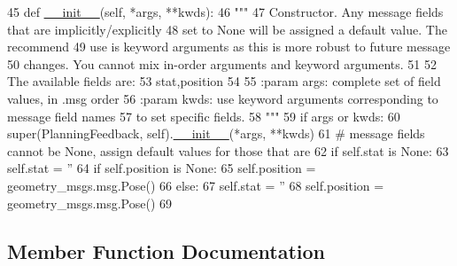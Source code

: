 \begin{DoxyCode}
45   \textcolor{keyword}{def }\hyperlink{classstate__machine_1_1Play_a5993a23d8be7f7b2647f71ede0334957}{\_\_init\_\_}(self, *args, **kwds):
46     \textcolor{stringliteral}{"""}
47 \textcolor{stringliteral}{    Constructor. Any message fields that are implicitly/explicitly}
48 \textcolor{stringliteral}{    set to None will be assigned a default value. The recommend}
49 \textcolor{stringliteral}{    use is keyword arguments as this is more robust to future message}
50 \textcolor{stringliteral}{    changes.  You cannot mix in-order arguments and keyword arguments.}
51 \textcolor{stringliteral}{}
52 \textcolor{stringliteral}{    The available fields are:}
53 \textcolor{stringliteral}{       stat,position}
54 \textcolor{stringliteral}{}
55 \textcolor{stringliteral}{    :param args: complete set of field values, in .msg order}
56 \textcolor{stringliteral}{    :param kwds: use keyword arguments corresponding to message field names}
57 \textcolor{stringliteral}{    to set specific fields.}
58 \textcolor{stringliteral}{    """}
59     \textcolor{keywordflow}{if} args \textcolor{keywordflow}{or} kwds:
60       super(PlanningFeedback, self).\hyperlink{classstate__machine_1_1Play_a5993a23d8be7f7b2647f71ede0334957}{\_\_init\_\_}(*args, **kwds)
61       \textcolor{comment}{# message fields cannot be None, assign default values for those that are}
62       \textcolor{keywordflow}{if} self.stat \textcolor{keywordflow}{is} \textcolor{keywordtype}{None}:
63         self.stat = \textcolor{stringliteral}{''}
64       \textcolor{keywordflow}{if} self.position \textcolor{keywordflow}{is} \textcolor{keywordtype}{None}:
65         self.position = geometry\_msgs.msg.Pose()
66     \textcolor{keywordflow}{else}:
67       self.stat = \textcolor{stringliteral}{''}
68       self.position = geometry\_msgs.msg.Pose()
69 
\end{DoxyCode}


\subsection{Member Function Documentation}
\mbox{\label{classmotion__plan_1_1msg_1_1__PlanningFeedback_1_1PlanningFeedback_ae0a926b09f1405a29f83bf3b609cf5a1}} 
